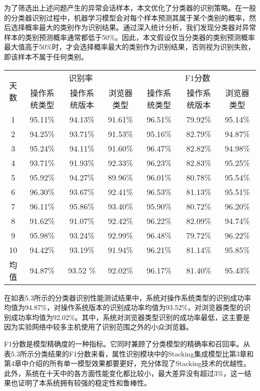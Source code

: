 为了筛选出上述问题产生的异常会话样本，本文优化了分类器的识别策略。在一般的分类器识别过程中，机器学习模型会对每个样本预测其属于某个类别的概率，然后选择概率最大的类别作为识别结果。通过深入统计分析，我们发现分类器对异常样本的类别预测概率通常都低于50\%。因此，本文假设仅当分类器的类别预测概率最大值高于50\%时，才会选择概率最大的类别作为识别结果，否则视为识别失败，即该样本不属于任何类别。

\begin{table}[!h] 
    \centering
    \footnotesize
    \renewcommand{\arraystretch}{1}
\begin{tabular}{ccccccc}
\toprule
\multirow{2}{*}{天数} & \multicolumn{3}{c}{识别率} & \multicolumn{3}{c}{F1分数} \\ \cline{2-7}
& 操作系统类型 & 操作系统版本 & 浏览器类型 &操作系统类型 & 操作系统版本 & 浏览器类型 \\ \hline
1 & 95.11\% & 94.13\% & 91.61\% & 96.51\% & 79.92\% & 95.14\% \\
2 & 94.25\% & 93.71\% &  91.53\% & 95.16\% & 82.79\% & 94.87\% \\
3 & 95.24\% & 94.11\% & 91.60\% & 96.47\% & 82.82\% & 94.98\% \\
4 & 93.71\% & 91.93\% & 92.33\% & 96.23\% & 82.83\% & 95.25\% \\
5 & 95.92\% & 94.27\% & 89.96\% & 96.01\% & 80.78\% & 95.54\% \\
6 & 96.30\% & 93.67\% & 92.41\% & 96.53\% & 81.13\% & 95.51\% \\
7 & 96.11\% & 95.86\% & 93.40\% & 95.90\% & 80.72\% & 96.20\% \\
8 & 91.62\% & 91.07\% & 92.42\% & 96.22\% & 82.09\% & 94.74\% \\
9 & 95.98\% & 93.24\% & 92.99\% & 96.48\% & 79.72\% & 96.22\% \\
10 & 94.42\% & 93.19\% & 91.94\% & 96.21\% & 81.14\% & 95.85\% \\
均值& 94.87\% & 93.52 \% & 92.02\%  & 96.17\% & 81.40\% & 95.43\% \\
\bottomrule
\end{tabular}
\end{table}

在如表5.3所示的分类器识别性能测试结果中，系统对操作系统类型的识别成功率均值为94.87\%，对操作系统版本的识别成功率均值为93.52\%，对浏览器类型的识别成功率均值为92.02\%。其中，系统对浏览器类型识别的成功率最低，这主要是因为实验网络中较多主机使用了识别范围之外的小众浏览器。

F1分数是模型精确度的一种指标。它同时兼顾了分类模型的精确率和召回率。从表5.3所示分类结果的F1分数来看，属性识别模块中的Stacking集成模型比第3章和第4章中介绍的所有单一模型效果都要更好，充分体现了Stacking技术的优越性。此外，系统在十天中的各方面性能变化都比较小，最大差异没有超过3\%，这一结果也证明了本系统拥有较强的稳定性和鲁棒性。

